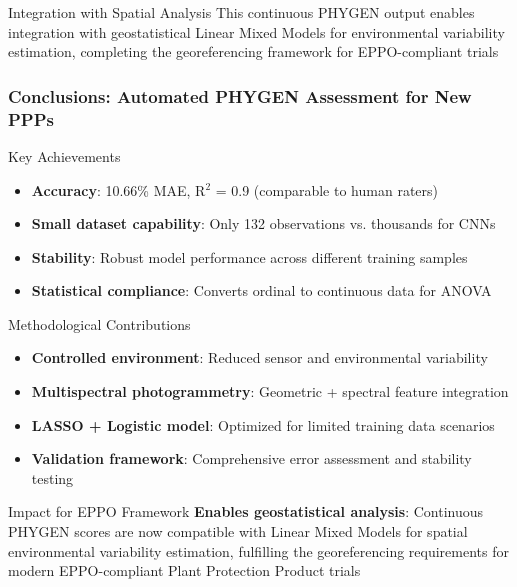 \documentclass[aspectratio=43]{beamer}
\begin{document}
\begin{frame}
    \begin{block}{Integration with Spatial Analysis}
        \small This continuous PHYGEN output enables integration with geostatistical Linear Mixed Models for environmental variability estimation, completing the georeferencing framework for EPPO-compliant trials
    \end{block}
\end{frame}


\begin{frame}
    \frametitle{Conclusions: Automated PHYGEN Assessment for New PPPs}
    
    \begin{exampleblock}{Key Achievements}
        \small
        \begin{itemize}
            \item \textbf{Accuracy}: 10.66\% MAE, R\ensuremath{^2} = 0.9 (comparable to human raters)
            \item \textbf{Small dataset capability}: Only 132 observations vs. thousands for CNNs
            \item \textbf{Stability}: Robust model performance across different training samples
            \item \textbf{Statistical compliance}: Converts ordinal to continuous data for ANOVA
        \end{itemize}
    \end{exampleblock}
    
    \begin{block}{Methodological Contributions}
        \small
        \begin{itemize}
            \item \textbf{Controlled environment}: Reduced sensor and environmental variability
            \item \textbf{Multispectral photogrammetry}: Geometric + spectral feature integration
            \item \textbf{LASSO + Logistic model}: Optimized for limited training data scenarios
            \item \textbf{Validation framework}: Comprehensive error assessment and stability testing
        \end{itemize}
    \end{block}
    
    \begin{alertblock}{Impact for EPPO Framework}
        \small
        \textbf{Enables geostatistical analysis}: Continuous PHYGEN scores are now compatible with Linear Mixed Models for spatial environmental variability estimation, fulfilling the georeferencing requirements for modern EPPO-compliant Plant Protection Product trials
    \end{alertblock}
\end{frame}
\end{document}
